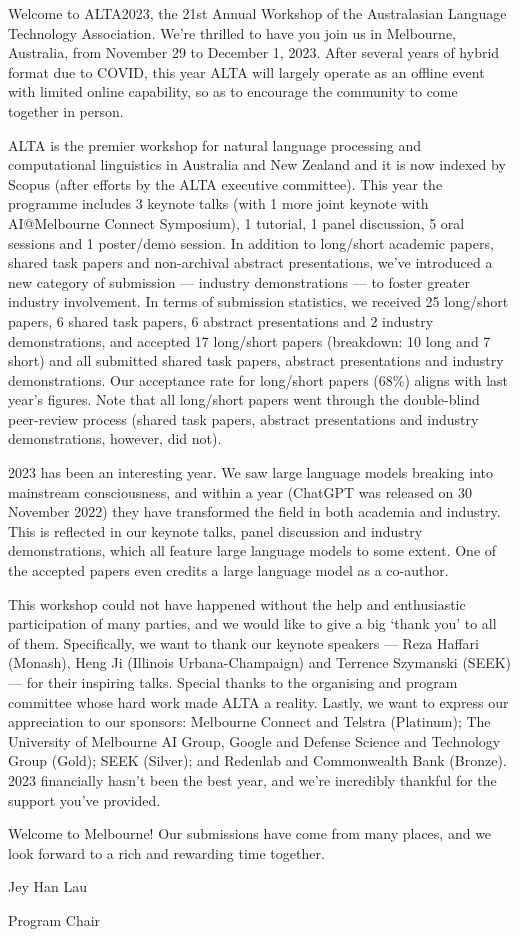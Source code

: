 Welcome to ALTA2023, the 21st Annual Workshop of the Australasian Language Technology Association. We're thrilled to have you join us in Melbourne, Australia, from November 29 to December 1, 2023. After several years of hybrid format due to COVID, this year ALTA will largely operate as an offline event with limited online capability, so as to encourage the community to come together in person.\newline

ALTA is the premier workshop for natural language processing and computational linguistics in Australia and New Zealand and it is now indexed by Scopus (after efforts by the ALTA executive committee). This year the programme includes 3 keynote talks (with 1 more joint keynote with AI@Melbourne Connect Symposium), 1 tutorial, 1 panel discussion, 5 oral sessions and 1 poster/demo session. In addition to long/short academic papers, shared task papers and non-archival abstract presentations, we've introduced a new category of submission --- industry demonstrations --- to foster greater industry involvement. In terms of submission statistics, we received 25 long/short papers, 6 shared task papers, 6 abstract presentations and 2 industry demonstrations, and accepted 17 long/short papers (breakdown: 10 long and 7 short) and all submitted shared task papers, abstract presentations and industry demonstrations. Our acceptance rate for long/short papers (68\%) aligns with last year's figures. Note that all long/short papers went through the double-blind peer-review process (shared task papers, abstract presentations and industry demonstrations, however, did not). \newline

2023 has been an interesting year. We saw large language models breaking into mainstream consciousness, and within a year (ChatGPT was released on 30 November 2022) they have transformed the field in both academia and industry. This is reflected in our keynote talks, panel discussion and industry demonstrations, which all feature large language models to some extent. One of the accepted papers even credits a large language model as a co-author.\newline

This workshop could not have happened without the help and enthusiastic participation of many parties, and we would like to give a big `thank you' to all of them. Specifically, we want to thank our keynote speakers --- Reza Haffari (Monash), Heng Ji (Illinois Urbana-Champaign) and Terrence Szymanski (SEEK) --- for their inspiring talks. Special thanks to the organising and program committee whose hard work made ALTA a reality. Lastly, we want to express our appreciation to our sponsors: Melbourne Connect and Telstra (Platinum); The University of Melbourne AI Group, Google and Defense Science and Technology Group (Gold); SEEK (Silver); and Redenlab and Commonwealth Bank (Bronze). 2023 financially hasn't been the best year, and we're incredibly thankful for the support you've provided.\newline

Welcome to Melbourne! Our submissions have come from many places, and we look forward to a rich and rewarding time together.\newline\newline\newline

Jey Han Lau\newline

Program Chair
